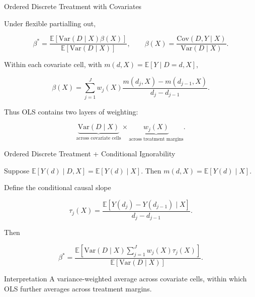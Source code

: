 \documentclass[aspectratio=169,11pt]{beamer}
\begin{document}
\begin{frame}{Ordered Discrete Treatment with Covariates}
\small

Under flexible partialling out,

\[
\beta^*
=
\frac{
\mathbb{E}
[
\mathrm{Var}(D\mid X)\beta(X)
]
}{
\mathbb{E}
[
\mathrm{Var}(D\mid X)
]
},
\qquad
\beta(X)
=
\frac{
\mathrm{Cov}(D,Y\mid X)
}{
\mathrm{Var}(D\mid X)
}.
\]

Within each covariate cell, with \(m(d,X)=\mathbb{E}[Y\mid D=d,X]\),

\[
\beta(X)
=
\sum_{j=1}^{J}
w_j(X)
\frac{
m(d_j,X)-m(d_{j-1},X)
}{
d_j-d_{j-1}
}.
\]

Thus OLS contains \alert{two layers of weighting}:

\[
\boxed{
\underbrace{\mathrm{Var}(D\mid X)}_{\text{across covariate cells}}
\times
\underbrace{w_j(X)}_{\text{across treatment margins}}.
}
\]

\end{frame}


\begin{frame}{Ordered Discrete Treatment + Conditional Ignorability}
\small

Suppose
\(\mathbb{E}[Y(d)\mid D,X]=\mathbb{E}[Y(d)\mid X]\).
Then \(m(d,X)=\mathbb{E}[Y(d)\mid X]\).

\medskip

Define the conditional causal slope

\[
\tau_j(X)
=
\frac{
\mathbb{E}[Y(d_j)-Y(d_{j-1})\mid X]
}{
d_j-d_{j-1}
}.
\]

Then

\[
\boxed{
\beta^*
=
\frac{
\mathbb{E}
\left[
\mathrm{Var}(D\mid X)
\sum_{j=1}^{J}
w_j(X)\tau_j(X)
\right]
}{
\mathbb{E}
[
\mathrm{Var}(D\mid X)
]
}.
}
\]

\begin{block}{Interpretation}
A variance-weighted average across covariate cells,
within which OLS further averages across treatment margins.
\end{block}

\end{frame}
\end{document}

